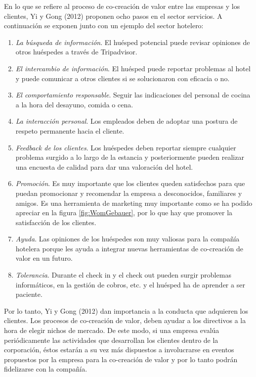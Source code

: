 En lo que se refiere al proceso de co-creación de valor entre las empresas y los clientes, Yi y Gong (2012) proponen ocho pasos en el sector servicios. A continuación se exponen junto con un ejemplo del sector hotelero:

\begin{enumerate}
	\item \emph{La búsqueda de información}. El huésped potencial puede revisar opiniones de otros huéspedes a través de Tripadvisor.
	\item \emph{El intercambio de información}. El huésped puede reportar problemas al hotel y puede comunicar a otros clientes si se solucionaron con eficacia o no.
	\item \emph{El comportamiento responsable}. Seguir las indicaciones del personal de cocina a la hora del desayuno, comida o cena.
	\item \emph{La interacción personal}. Los empleados deben de adoptar una postura de respeto permanente hacia el cliente.
	\item \emph{Feedback de los clientes}. Los huéspedes deben reportar siempre cualquier problema surgido a lo largo de la estancia y posteriormente pueden realizar una encuesta de calidad para dar una valoración del hotel.
	\item \emph{Promoción}. Es muy importante que los clientes queden satisfechos para que puedan promocionar y recomendar la empresa a desconocidos, familiares y amigos. Es una herramienta de marketing muy importante como se ha podido apreciar en la figura \ref{fig:WomGebauer}, por lo que hay que promover la satisfacción de los clientes.
	\item \emph{Ayuda}. Las opiniones de los huéspedes son muy valiosas para la compañía hotelera porque les ayuda a integrar nuevas herramientas de co-creación de valor en un futuro.
	\item \emph{Tolerancia}. Durante el check in y el check out pueden surgir problemas informáticos, en la gestión de cobros, etc. y el huésped ha de aprender a ser paciente.

\end{enumerate}


Por lo tanto, Yi y Gong (2012) dan importancia a la conducta que adquieren los clientes. Los procesos de co-creación de valor, deben ayudar a los directivos a la hora de elegir nichos de mercado. De este modo, si una empresa evalúa periódicamente las actividades que desarrollan los clientes dentro de la corporación, éstos estarán a su vez más dispuestos a involucrarse en eventos propuestos por la empresa para la co-creación de valor y por lo tanto podrán fidelizarse con la compañía.

